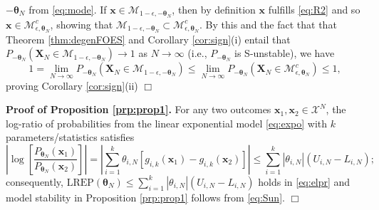 \documentclass[numbib]{imamat}
\theoremstyle{theorem}
\theoremstyle{lemma}
\theoremstyle{example}
\theoremstyle{corollary}
\theoremstyle{definition}
\theoremstyle{remark}
\theoremstyle{approximation}
\theoremstyle{scheme}
\newcommand{\REP}{\mathrm{LREP}}
\begin{document}
\(-\boldsymbol \theta_N\) from \eqref{eq:mode}. If
\(\boldsymbol x \in\mathcal{M}_{1-\epsilon, -\boldsymbol \theta_N}\),
then by definition \(\boldsymbol x\) fulfills \eqref{eq:R2} and so
\(\boldsymbol x \in \mathcal{M}_{\epsilon, \boldsymbol \theta_N}^c\),
showing that
\(\mathcal{M}_{1-\epsilon, -\boldsymbol \theta_N} \subset \mathcal{M}_{\epsilon, \boldsymbol \theta_N}^c\).
By this and the fact that that Theorem \ref{thm:degenFOES} and Corollary
\ref{cor:sign}(i) entail that
\(P_{-\boldsymbol \theta_N}(\boldsymbol X_N \in \mathcal{M}_{1-\epsilon, -\boldsymbol \theta_N})\to 1\)
as \(N\to \infty\) (i.e., \(P_{-\boldsymbol \theta_N}\) is S-unstable),
we have \[
1  = \lim_{N\to \infty} P_{-\boldsymbol \theta_N}(\boldsymbol X_N \in \mathcal{M}_{1-\epsilon, -\boldsymbol \theta_N}) \leq \lim_{N\to \infty} P_{-\boldsymbol \theta_N}(\boldsymbol X_N \in \mathcal{M}_{\epsilon, \boldsymbol \theta_N}^c ) \leq 1,
\] proving Corollary \ref{cor:sign}(ii) \hfill \(\Box\)

\textbf{Proof of Proposition \ref{prp:prop1}.} For any two outcomes
\(\boldsymbol x_1, \boldsymbol x_2\in\mathcal{X}^N\), the log-ratio of
probabilities from the linear exponential model \eqref{eq:expo} with \(k\)
parameters/statistics satisfies \[
\left|\log \left[ \frac{P_{\boldsymbol \theta_N}(\boldsymbol x_1)}{P_{\boldsymbol \theta_N}(\boldsymbol x_2)}  \right] \right| =
\left|  \sum_{i=1}^k \theta_{i,N} [g_{i,k}(\boldsymbol x_1) - g_{i,k}(\boldsymbol x_2) ] \right|  \leq  \sum_{i=1}^k | \theta_{i,N}| (U_{i,N}-L_{i,N});
\] consequently,
\(\REP(\boldsymbol \theta_N ) \leq \sum_{i=1}^k | \theta_{i,N}| (U_{i,N}-L_{i,N})\)
holds in \eqref{eq:elpr} and model stability in Proposition
\ref{prp:prop1} follows from \eqref{eq:Sun}. \hfill \(\Box\)
\end{document}
